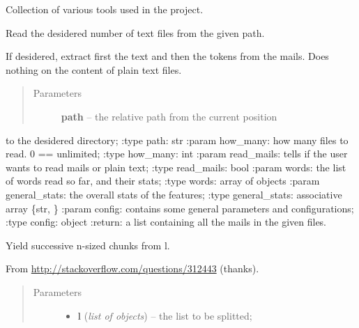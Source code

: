 \documentclass[letterpaper,10pt,english]{sphinxmanual}
\begin{document}
\begin{fulllineitems}
\label{index:utils.Utils}
Collection of various tools used in the project.

\begin{fulllineitems}
\label{index:utils.Utils._read_files}
Read the desidered number of text files from the given path.

If desidered, extract first the text and then the tokens
from the mails. Does nothing on the content of plain text files.
\begin{quote}\begin{description}
\item[{Parameters}] \leavevmode
\textbf{path} -- the relative path from the current position

\end{description}\end{quote}

to the desidered directory;
:type path: str
:param how\_many: how many files to read. 0 == unlimited;
:type how\_many: int
:param read\_mails: tells if the user wants to read mails or plain text;
:type read\_mails: bool
:param words: the list of words read so far, and their stats;
:type words: array of {\hyperref[index:gen_stat.Word]{}} objects
:param general\_stats: the overall stats of the features;
:type general\_stats: associative array \{str, {\hyperref[index:gen_stat.Stat]{}}\}
:param config: contains some general parameters and configurations;
:type config: {\hyperref[index:config.Config]{}} object
:return: a list containing all the mails in the given files.

\end{fulllineitems}


\begin{fulllineitems}
\label{index:utils.Utils.chunks}
Yield successive n-sized chunks from l.

From \href{http://stackoverflow.com/questions/312443}{http://stackoverflow.com/questions/312443} (thanks).
\begin{quote}\begin{description}
\item[{Parameters}] \leavevmode\begin{itemize}
\item {} 
\textbf{l} (\emph{list of objects}) -- the list to be splitted;


\end{itemize}
\end{description}
\end{quote}
\end{fulllineitems}
\end{fulllineitems}
\end{document}
